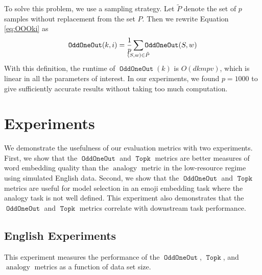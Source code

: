 \documentclass[11pt,a4paper]{article}
\DeclareMathOperator{\OddOneOut}{\texttt{OddOneOut}}
\DeclareMathOperator{\topk}{\texttt{Topk}}
\DeclareMathOperator{\analogy}{analogy}
\begin{document}
To solve this problem, we use a sampling strategy.
Let $\tilde P$ denote the set of $p$ samples without replacement from the set $P$.
Then we rewrite Equation \ref{eq:OOOki} as
\begin{equation}
    \OddOneOut(k,i) = \frac 1 p \sum_{\mathclap{(S,w) \in \tilde P}} \OddOneOut(S,w)
\end{equation}
With this definition, the runtime of $\OddOneOut(k)$ is $O(dkmpv)$,
which is linear in all the parameters of interest.
In our experiments, we found $p=1000$ to give sufficiently accurate results without taking too much computation.

\section{Experiments}
\label{sec:experiments}

We demonstrate the usefulness of our evaluation metrics with two experiments.
First, we show that the $\OddOneOut$ and $\topk$ metrics are better measures of word embedding quality than the $\analogy$ metric in the low-resource regime using simulated English data.
Second, we show that the $\OddOneOut$ and $\topk$ metrics are useful for model selection in an emoji embedding task where the analogy task is not well defined.
This experiment also demonstrates that the $\OddOneOut$ and $\topk$ metrics correlate with downstream task performance.

\subsection{English Experiments}
\label{sec:experiments:eng}

This experiment measures the performance of the $\OddOneOut$, $\topk$, and $\analogy$ metrics as a function of data set size.

\end{document}
